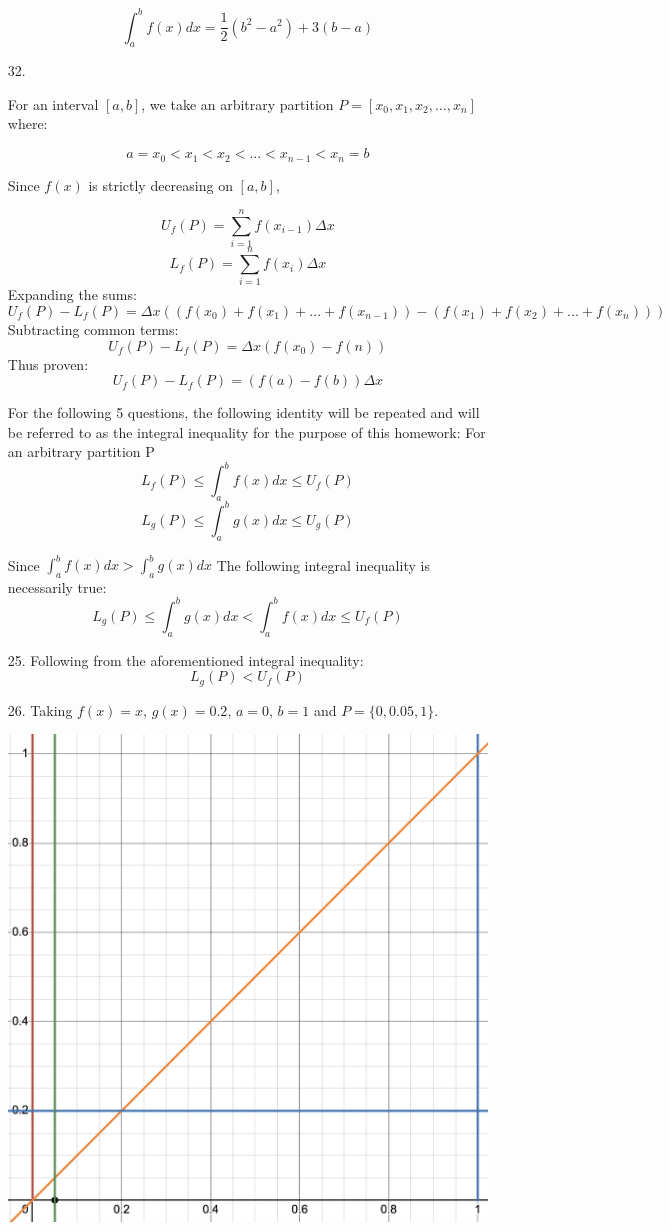 \documentclass[12pt]{article}
\begin{document}
\begin{enumerate}[start=1,label={\bfseries. },leftmargin=1in]
\[
\int_{a}^b f(x)dx = \frac{1}{2}(b^2 - a^2) + 3(b-a)
\]

\item [32. ]

For an interval $[a,b]$, we take an arbitrary partition $P = [x_0, x_1, x_2,...,x_n]$ where:

\[
a = x_0 < x_1 < x_2 <...<x_{n-1}<x_n = b
\]

Since $f(x)$ is strictly decreasing on $[a,b]$,

\[
U_f(P) = \sum_{i=1}^n f(x_{i-1}) \Delta x 
\]
\[
L_f(P) = \sum_{i=1}^n f(x_{i})\Delta x 
\]
Expanding the sums:
\[
U_f(P) - L_f(P) = \Delta x((f(x_0) + f(x_1)+ ...+f(x_{n-1})) - (f(x_1) + f(x_2)+ ...+f(x_{n})))
\]
Subtracting common terms:
\[
U_f(P) - L_f(P) = \Delta x(f(x_0) - f(n))
\]
Thus proven:
\[
U_f(P) - L_f(P) = (f(a) - f(b))\Delta x
\]
\newpage

For the following 5 questions, the following identity will be repeated and will be referred to as the integral inequality for the purpose of this homework:
For an arbitrary partition P
\[
L_f(P) \leq \int_a^b f(x)dx \leq U_f(P)
\]
\[
L_g(P) \leq \int_a^b g(x) dx \leq U_g(P)
\]

Since $\int_a^b f(x)dx > \int_a^b g(x)dx$
The following integral inequality is necessarily true:
\[
L_g(P) \leq \int_a^b g(x)dx < \int_a^b f(x)dx \leq U_f(P)
\]

\item [25. ]
Following from the aforementioned integral inequality:
\[
L_g(P) < U_f(P)
\]

\item [26. ] Taking $f(x) = x$, $g(x) = 0.2$, $a = 0$, $b = 1$ and $P = \{0, 0.05, 1\}$.

\includegraphics[width=0.75\linewidth]{Math 134//Images/26.png}


\end{enumerate}
\end{document}
